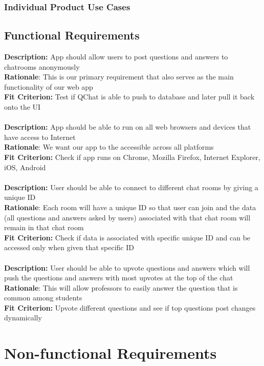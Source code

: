 \documentclass[12pt, titlepage]{article}
\begin{document}
\subsubsection{Individual Product Use Cases}

\subsection{Functional Requirements}
\textbf{Description:} App should allow users to post questions and answers to chatrooms anonymously \\
\textbf{Rationale}: This is our primary requirement that also serves as the main functionality of our web app \\
\textbf{Fit Criterion:} Test if QChat is able to push to database and later pull it back onto the UI \\
\\
\textbf{Description:} App should be able to run on all web browsers and devices that have access to Internet \\
\textbf{Rationale}: We want our app to the accessible across all platforms \\
\textbf{Fit Criterion:} Check if app runs on Chrome, Mozilla Firefox, Internet Explorer, iOS, Android \\
\\
\textbf{Description:} User should be able to connect to different chat rooms by giving a unique ID  \\
\textbf{Rationale}: Each room will have a unique ID so that user can join and the data (all questions and answers asked by users)  associated with that chat room will remain in that chat room \\
\textbf{Fit Criterion:} Check if data is associated with specific unique ID and can be 
accessed only when given that specific ID \\
\\
\textbf{Description:} User should be able to upvote questions and answers which will push the questions and answers with most upvotes at the top of the chat \\
\textbf{Rationale}: This will allow professors to easily answer the question that is common among students \\
\textbf{Fit Criterion:} Upvote different questions and see if top questions post changes dynamically 

\section{Non-functional Requirements}
\end{document}
